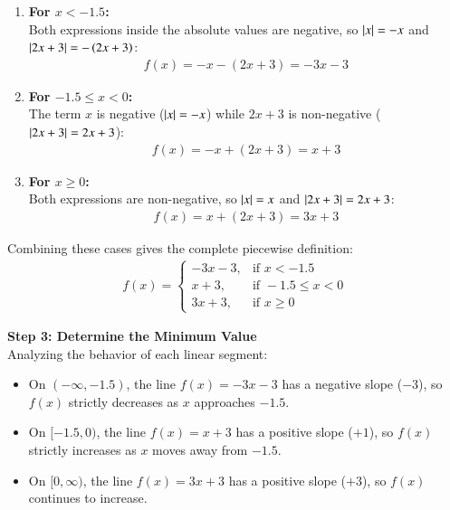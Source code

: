 \documentclass[journal,12pt,onecolumn]{IEEEtran}
\DeclarePairedDelimiter\abs{\lvert}{\rvert}
\newcommand{\brak}[1]{\left(#1\right)}
\theoremstyle{remark}
\begin{document}
\begin{enumerate}
    \item \textbf{For $x < -1.5$:} \\
    Both expressions inside the absolute values are negative, so $\abs{x} = -x$ and $\abs{2x+3} = -\brak{2x+3}$:
    \begin{align}
    f\brak{x} = -x - \brak{2x + 3} = -3x - 3
    \end{align}

    \item \textbf{For $-1.5 \le x < 0$:} \\
    The term $x$ is negative ($\abs{x} = -x$) while $2x+3$ is non-negative ($\abs{2x+3} = 2x+3$):
    \begin{align}
    f\brak{x} = -x + \brak{2x + 3} = x + 3
    \end{align}

    \item \textbf{For $x \ge 0$:} \\
    Both expressions are non-negative, so $\abs{x} = x$ and $\abs{2x+3} = 2x+3$:
    \begin{align}
    f\brak{x} = x + \brak{2x + 3} = 3x + 3
    \end{align}
\end{enumerate}

Combining these cases gives the complete piecewise definition:
\begin{align}
f\brak{x} = \begin{cases} 
-3x - 3, & \text{if } x < -1.5 \\
x + 3, & \text{if } -1.5 \le x < 0 \\
3x + 3, & \text{if } x \ge 0 
\end{cases}
\end{align}

\noindent \textbf{Step 3: Determine the Minimum Value}\\
Analyzing the behavior of each linear segment:
\begin{itemize}
    \item On $\brak{-\infty, -1.5}$, the line $f\brak{x} = -3x - 3$ has a negative slope ($-3$), so $f\brak{x}$ strictly decreases as $x$ approaches $-1.5$.
    \item On $[-1.5, 0)$, the line $f\brak{x} = x + 3$ has a positive slope ($+1$), so $f\brak{x}$ strictly increases as $x$ moves away from $-1.5$.
    \item On $[0, \infty)$, the line $f\brak{x} = 3x + 3$ has a positive slope ($+3$), so $f\brak{x}$ continues to increase.
\end{itemize}
\end{document}
